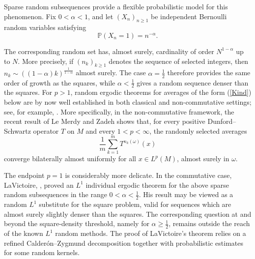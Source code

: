 \documentclass[12pt]{amsart}
\theoremstyle{remark}
\theoremstyle{definition}
\numberwithin{equation}{section}
\begin{document}
Sparse random subsequences provide a flexible probabilistic model for this
phenomenon. Fix $0<\alpha<1$, and let $(X_n)_{n\geq 1}$ be independent
Bernoulli random variables satisfying
\[
   \mathbb P(X_n=1)=n^{-\alpha}.
\]

The corresponding random set has, almost surely, cardinality of order
$N^{1-\alpha}$ up to $N$. More precisely, if $(n_k)_{k\geq 1}$ denotes the
sequence of selected integers, then
$n_k\sim ((1-\alpha)k)^{\frac{1}{1-\alpha}}$
almost surely. The case $\alpha=\frac12$ therefore provides 
the same order of growth
as the squares, while $\alpha<\frac12$ gives a random sequence 
denser than the
squares. For $p>1$, random ergodic theorems 
for averages of the form (\ref{Kind}) below are by now well
established in both classical and non-commutative settings; 
see, for example,
\cite{B, LZ}. More specifically,
in the non-commutative framework, the recent result of
Le Merdy and Zadeh \cite{LZ} shows that, for every positive
Dunford--Schwartz operator $T$ on $M$ and every
$1<p<\infty$, the randomly selected averages
\begin{equation}\label{Kind}
   \frac{1}{m}\sum_{k=1}^m T^{n_k(\omega)}(x)
\end{equation}
converge bilaterally almost uniformly for all $x\in L^p(M)$, almost surely
in $\omega$.

The endpoint $p=1$ is considerably more delicate. In the commutative case,
LaVictoire, \cite{LaV}, proved an $L^1$ individual ergodic theorem for the above sparse
random subsequences in the range $0<\alpha<\frac12$. 
His result may be
viewed as a random $L^1$ substitute for the square problem, valid for
sequences which are almost surely slightly denser than the squares. The
corresponding question at and beyond the square-density threshold, namely for
$\alpha\geq \frac12$, remains outside the reach of the known $L^1$ random
methods. The proof of LaVictoire's theorem relies on a refined
Calder\'on--Zygmund decomposition together with probabilistic estimates for
some random kernels.
\end{document}
